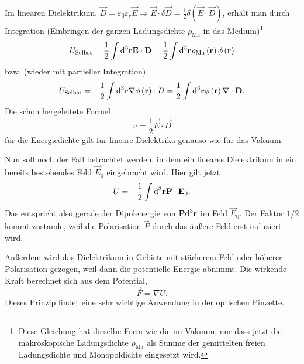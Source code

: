 Im linearen Dielektrikum, $\vec {D}=\varepsilon _{0}\varepsilon _{r}\vec {E}\Rightarrow \vec {E}\cdot \delta \vec {D}=\frac{1}{2}\delta \left(\vec {E}\cdot \vec {D}\right)$, erhält man durch Integration (Einbringen der ganzen Ladungsdichte $\rho _{\mathrm{Ma}}$ in das Medium)\footnote{Diese Gleichung hat dieselbe Form wie die im Vakuum, nur dass jetzt die makroskopische Ladungsdichte $\rho _{\mathrm{Ma}}$ als Summe der gemittelten freien Ladungsdichte und Monopoldichte eingesetzt wird. }
\begin{equation*}
	U_{\text{Selbst}}=\frac{1}{2}\int \text{d} ^{3}\mathbf{r}\mathbf{E}\cdot \mathbf{D}=\frac{1}{2}\int \text{d} ^{3}\mathbf{r}\rho _{\mathrm{Ma}}\left(\mathbf{r}\right)\phi \left(\mathbf{r}\right)
\end{equation*}
bzw. (wieder mit partieller Integration)
\begin{equation*}
	U_{\text{Selbst}}=-\frac{1}{2}\int \text{d} ^{3}\mathbf{r}\nabla \phi \left(\mathbf{r}\right)\cdot D=\frac{1}{2}\int \text{d} ^{3}\mathbf{r}\phi \left(\mathbf{r}\right)\nabla \cdot \mathbf{D}.
\end{equation*}
Die schon hergeleitete Formel
\begin{equation*}
	u=\frac{1}{2}\vec {E}\cdot \vec {D}
\end{equation*}
für die Energiedichte gilt für lineare Dielektrika genauso wie für das Vakuum.

Nun soll noch der Fall betrachtet werden, in dem ein lineares Dielektrikum in ein bereits bestehendes Feld $\vec {E}_{0}$ eingebracht wird. Hier gilt jetzt
\begin{equation*}
	U=-\frac{1}{2}\int \text{d} ^{3}\mathbf{r}\mathbf{P}\cdot \mathbf{E}_{0}.
\end{equation*}
Das entspricht also gerade der Dipolenergie von $\mathbf{P}\text{d} ^{3}\mathbf{r}$ im Feld $\vec {E}_{0}$. Der Faktor $1/2$ kommt zustande, weil die Polarisation $\vec {P}$ durch das äußere Feld erst induziert wird.

Außerdem wird das Dielektrikum in Gebiete mit stärkerem Feld oder höherer Polarisation gezogen, weil dann die potentielle Energie abnimmt. Die wirkende Kraft berechnet sich aus dem Potential,
\begin{equation*}
	\vec {F}=\nabla U.
\end{equation*}
Dieses Prinzip findet eine sehr wichtige Anwendung in der optischen Pinzette.

